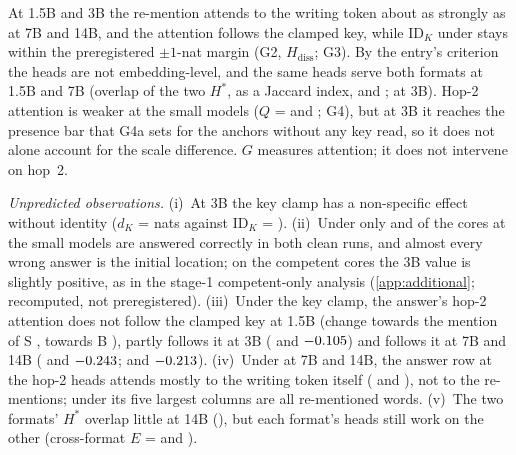 \begin{table}[!ht]
\centering
\small
\caption{\textbf{Re-mention attention} (preregistration G, part (a)). $E$: excess attention of the later mention of B to the writing token at the three selected heads; $F/E$: the share of it that follows the key clamp; $G$: excess attention of the answer position to the mention of B (hop~2) at its own three heads; $\mathrm{ID}_K$ and the non-specific key effect $d_K$ (nats) from the same eager run, scored in the casing the model emits. Heads selected on odd-indexed and evaluated on even-indexed cores of 150; 95\% bootstrap CIs. Under \fmtPost{}: G1 at 7B and 14B, G2 and G3 at 1.5B and 3B, G4 in all four; \fmtOpt{} is the gate and the reference of G3.}
\label{tab:attention}

\end{table}

At 1.5B and 3B the re-mention attends to the writing token about as strongly as at 7B and 14B, and the attention follows the clamped key, while $\mathrm{ID}_K$ under \fmtPost{} stays within the preregistered $\pm 1$-nat margin (G2, $H_{\mathrm{diss}}$; G3). By the entry's criterion the heads are not embedding-level, and the same heads serve both formats at 1.5B and 7B (overlap of the two $H^*$, as a Jaccard index, \GaJaccardQwenOnefive{} and \GaJaccardQwenSeven{}; \GaJaccardQwenThree{} at 3B). Hop-2 attention is weaker at the small models ($Q$ = \GfourbQQwenOnefive{} and \GfourbQQwenThree{}; G4), but at 3B it reaches the presence bar that G4a sets for the anchors without any key read, so it does not alone account for the scale difference. $G$ measures attention; it does not intervene on hop~2.

\emph{Unpredicted observations.} (i)~At 3B the key clamp has a non-specific effect without identity ($d_K$ = \GaDKCapPostQwenThree{} nats against $\mathrm{ID}_K$ = \GaIDKCapPostQwenThree{}). (ii)~Under \fmtPost{} only \GaCompetentPostQwenOnefive{} and \GaCompetentPostQwenThree{} of the cores at the small models are answered correctly in both clean runs, and almost every wrong answer is the initial location; on the competent cores the 3B value is slightly positive, as in the stage-1 competent-only analysis (\cref{app:additional}; recomputed, not preregistered). (iii)~Under the key clamp, the answer's hop-2 attention does not follow the clamped key at 1.5B (change towards the mention of S \GaDansSPostQwenOnefive{}, towards B \GaDansBPostQwenOnefive{}), partly follows it at 3B (\GaDansSPostQwenThree{} and $-0.105$) and follows it at 7B and 14B (\GaDansSPostQwenSeven{} and $-0.243$; \GaDansSPostQwenFourteen{} and $-0.213$). (iv)~Under \fmtPost{} at 7B and 14B, the answer row at the hop-2 heads attends mostly to the writing token itself (\GaAnsToPQwenSeven{} and \GaAnsToPQwenFourteen{}), not to the re-mentions; under \fmtOpt{} its five largest columns are all re-mentioned words. (v)~The two formats' $H^*$ overlap little at 14B (\GaJaccardQwenFourteen{}), but each format's heads still work on the other (cross-format $E$ = \GaEcrossPostQwenFourteen{} and \GaEcrossOptQwenFourteen{}).

